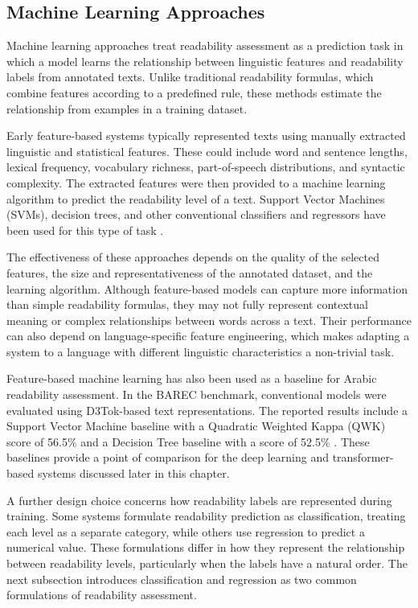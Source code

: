 \documentclass[12pt]{report}
\begin{document}
\subsection{Machine Learning Approaches}

Machine learning approaches treat readability assessment as a prediction task in which a model learns the relationship between linguistic features and readability labels from annotated texts. Unlike traditional readability formulas, which combine features according to a predefined rule, these methods estimate the relationship from examples in a training dataset.

Early feature-based systems typically represented texts using manually extracted linguistic and statistical features. These could include word and sentence lengths, lexical frequency, vocabulary richness, part-of-speech distributions, and syntactic complexity. The extracted features were then provided to a machine learning algorithm to predict the readability level of a text. Support Vector Machines (SVMs), decision trees, and other conventional classifiers and regressors have been used for this type of task \cite{schwarm2005reading}.

The effectiveness of these approaches depends on the quality of the selected features, the size and representativeness of the annotated dataset, and the learning algorithm. Although feature-based models can capture more information than simple readability formulas, they may not fully represent contextual meaning or complex relationships between words across a text. Their performance can also depend on language-specific feature engineering, which makes adapting a system to a language with different linguistic characteristics a non-trivial task.

Feature-based machine learning has also been used as a baseline for Arabic readability assessment. In the BAREC benchmark, conventional models were evaluated using D3Tok-based text representations. The reported results include a Support Vector Machine baseline with a Quadratic Weighted Kappa (QWK) score of 56.5\% and a Decision Tree baseline with a score of 52.5\% \cite{elmadani2025barec}. These baselines provide a point of comparison for the deep learning and transformer-based systems discussed later in this chapter.

A further design choice concerns how readability labels are represented during training. Some systems formulate readability prediction as classification, treating each level as a separate category, while others use regression to predict a numerical value. These formulations differ in how they represent the relationship between readability levels, particularly when the labels have a natural order. The next subsection introduces classification and regression as two common formulations of readability assessment.
\end{document}
